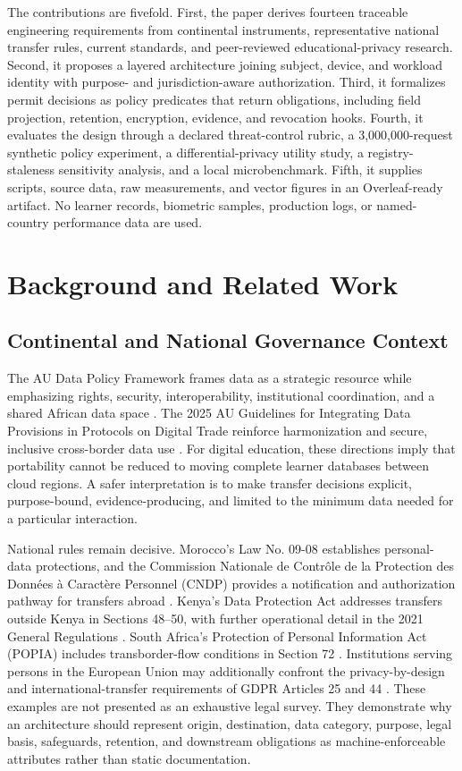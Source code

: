 \documentclass[journal]{IEEEtran}
\begin{document}
The contributions are fivefold. First, the paper derives fourteen traceable engineering requirements from continental instruments, representative national transfer rules, current standards, and peer-reviewed educational-privacy research. Second, it proposes a layered architecture joining subject, device, and workload identity with purpose- and jurisdiction-aware authorization. Third, it formalizes permit decisions as policy predicates that return obligations, including field projection, retention, encryption, evidence, and revocation hooks. Fourth, it evaluates the design through a declared threat-control rubric, a 3,000,000-request synthetic policy experiment, a differential-privacy utility study, a registry-staleness sensitivity analysis, and a local microbenchmark. Fifth, it supplies scripts, source data, raw measurements, and vector figures in an Overleaf-ready artifact. No learner records, biometric samples, production logs, or named-country performance data are used.

\section{Background and Related Work}
\subsection{Continental and National Governance Context}
The AU Data Policy Framework frames data as a strategic resource while emphasizing rights, security, interoperability, institutional coordination, and a shared African data space \cite{audatapolicy}. The 2025 AU Guidelines for Integrating Data Provisions in Protocols on Digital Trade reinforce harmonization and secure, inclusive cross-border data use \cite{audigitaltradeguidelines}. For digital education, these directions imply that portability cannot be reduced to moving complete learner databases between cloud regions. A safer interpretation is to make transfer decisions explicit, purpose-bound, evidence-producing, and limited to the minimum data needed for a particular interaction.

National rules remain decisive. Morocco's Law No. 09-08 establishes personal-data protections, and the Commission Nationale de Contr\^{o}le de la Protection des Donn\'{e}es \`{a} Caract\`{e}re Personnel (CNDP) provides a notification and authorization pathway for transfers abroad \cite{moroccolaw0908,cndptransfer}. Kenya's Data Protection Act addresses transfers outside Kenya in Sections 48--50, with further operational detail in the 2021 General Regulations \cite{kenyadpa,kenyaregulations}. South Africa's Protection of Personal Information Act (POPIA) includes transborder-flow conditions in Section 72 \cite{popia}. Institutions serving persons in the European Union may additionally confront the privacy-by-design and international-transfer requirements of GDPR Articles 25 and 44 \cite{gdpr}. These examples are not presented as an exhaustive legal survey. They demonstrate why an architecture should represent origin, destination, data category, purpose, legal basis, safeguards, retention, and downstream obligations as machine-enforceable attributes rather than static documentation.
\end{document}
